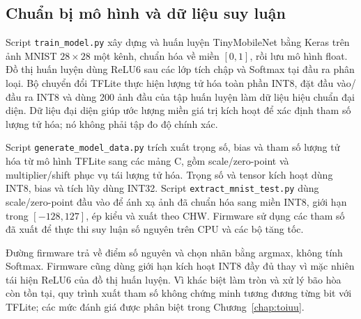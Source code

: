 \subsection{Chuẩn bị mô hình và dữ liệu suy luận}
Script \texttt{train\_model.py} xây dựng và huấn luyện TinyMobileNet bằng Keras trên ảnh MNIST $28\times28$ một kênh, chuẩn hóa về miền $[0,1]$, rồi lưu mô hình float. Đồ thị huấn luyện dùng ReLU6 sau các lớp tích chập và Softmax tại đầu ra phân loại. Bộ chuyển đổi TFLite thực hiện lượng tử hóa toàn phần INT8, đặt đầu vào/đầu ra INT8 và dùng 200 ảnh đầu của tập huấn luyện làm dữ liệu hiệu chuẩn đại diện. Dữ liệu đại diện giúp ước lượng miền giá trị kích hoạt để xác định tham số lượng tử hóa; nó không phải tập đo độ chính xác.

Script \texttt{generate\_model\_data.py} trích xuất trọng số, bias và tham số lượng tử hóa từ mô hình TFLite sang các mảng C, gồm scale/zero-point và multiplier/shift phục vụ tái lượng tử hóa. Trọng số và tensor kích hoạt dùng INT8, bias và tích lũy dùng INT32. Script \texttt{extract\_mnist\_test.py} dùng scale/zero-point đầu vào để ánh xạ ảnh đã chuẩn hóa sang miền INT8, giới hạn trong $[-128,127]$, ép kiểu và xuất theo CHW. Firmware sử dụng các tham số đã xuất để thực thi suy luận số nguyên trên CPU và các bộ tăng tốc.

Đường firmware trả về điểm số nguyên và chọn nhãn bằng argmax, không tính Softmax. Firmware cũng dùng giới hạn kích hoạt INT8 đầy đủ thay vì mặc nhiên tái hiện ReLU6 của đồ thị huấn luyện. Vì khác biệt làm tròn và xử lý bão hòa còn tồn tại, quy trình xuất tham số không chứng minh tương đương từng bit với TFLite; các mức đánh giá được phân biệt trong Chương~\ref{chap:toiuu}.
